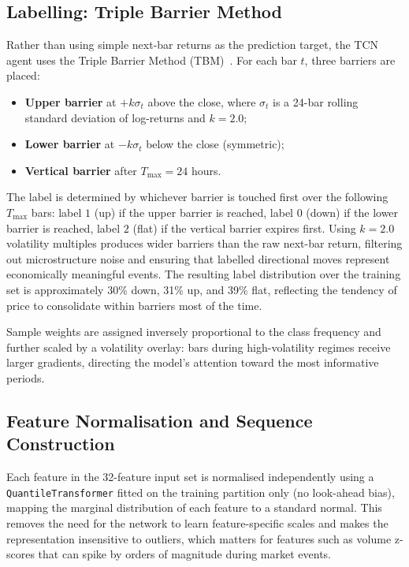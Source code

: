 \subsection{Labelling: Triple Barrier Method}

Rather than using simple next-bar returns as the prediction target, the TCN agent uses the Triple Barrier Method (TBM)~\cite{lopezdeprado2018advances}. For each bar $t$, three barriers are placed:
\begin{itemize}
    \item \textbf{Upper barrier} at $+k\sigma_t$ above the close, where $\sigma_t$ is a 24-bar rolling standard deviation of log-returns and $k = 2.0$;
    \item \textbf{Lower barrier} at $-k\sigma_t$ below the close (symmetric);
    \item \textbf{Vertical barrier} after $T_{\max} = 24$ hours.
\end{itemize}
The label is determined by whichever barrier is touched first over the following $T_{\max}$ bars: label $1$ (up) if the upper barrier is reached, label $0$ (down) if the lower barrier is reached, label $2$ (flat) if the vertical barrier expires first. Using $k = 2.0$ volatility multiples produces wider barriers than the raw next-bar return, filtering out microstructure noise and ensuring that labelled directional moves represent economically meaningful events. The resulting label distribution over the training set is approximately 30\% down, 31\% up, and 39\% flat, reflecting the tendency of price to consolidate within barriers most of the time.

Sample weights are assigned inversely proportional to the class frequency and further scaled by a volatility overlay: bars during high-volatility regimes receive larger gradients, directing the model's attention toward the most informative periods.

\subsection{Feature Normalisation and Sequence Construction}

Each feature in the 32-feature input set is normalised independently using a \texttt{QuantileTransformer} fitted on the training partition only (no look-ahead bias), mapping the marginal distribution of each feature to a standard normal. This removes the need for the network to learn feature-specific scales and makes the representation insensitive to outliers, which matters for features such as volume z-scores that can spike by orders of magnitude during market events.


